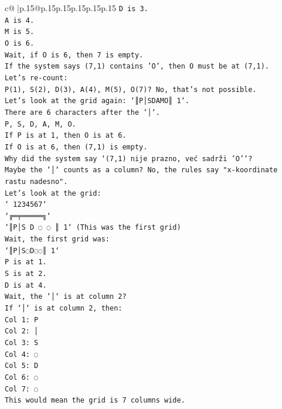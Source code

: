 \documentclass{article}
\begin{document}
{\begin{supertabular}{c@{$\;$}|p{.15\linewidth}@{}p{.15\linewidth}p{.15\linewidth}p{.15\linewidth}p{.15\linewidth}p{.15\linewidth}}
{{{\texttt{D is 3.} \\
\texttt{A is 4.} \\
\texttt{M is 5.} \\
\texttt{O is 6.} \\
\texttt{Wait, if O is 6, then 7 is empty.} \\
\texttt{If the system says (7,1) contains 'O', then O must be at (7,1).} \\
\texttt{Let's re{-}count:} \\
\texttt{P(1), S(2), D(3), A(4), M(5), O(7)? No, that's not possible.} \\
\texttt{Let's look at the grid again: `║P│SDAMO║ 1`.} \\
\texttt{There are 6 characters after the `│`.} \\
\texttt{P, S, D, A, M, O.} \\
\texttt{If P is at 1, then O is at 6.} \\
\texttt{If O is at 6, then (7,1) is empty.} \\
\texttt{Why did the system say `(7,1) nije prazno, već sadrži 'O'`?} \\
\texttt{Maybe the `│` counts as a column? No, the rules say "x{-}koordinate rastu nadesno".} \\
\texttt{Let's look at the grid:} \\
\texttt{` 1234567`} \\
\texttt{`╔═╤═════╗`} \\
\texttt{`║P│S D ◌ ◌ ║ 1` (This was the first grid)} \\
\texttt{Wait, the first grid was:} \\
\texttt{`║P│S◌D◌◌║ 1`} \\
\texttt{P is at 1.} \\
\texttt{S is at 2.} \\
\texttt{D is at 4.} \\
\texttt{Wait, the `│` is at column 2?} \\
\texttt{If `│` is at column 2, then:} \\
\texttt{Col 1: P} \\
\texttt{Col 2: │} \\
\texttt{Col 3: S} \\
\texttt{Col 4: ◌} \\
\texttt{Col 5: D} \\
\texttt{Col 6: ◌} \\
\texttt{Col 7: ◌} \\
\texttt{This would mean the grid is 7 columns wide.} \\
}}}
\end{supertabular}}
\end{document}
